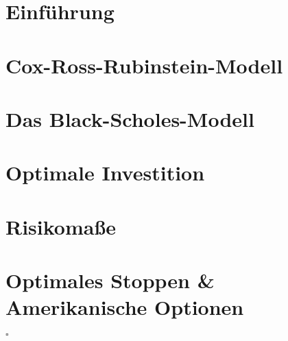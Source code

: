 \documentclass[ngerman, a4paper, 11pt]{report}
\institute{Stochastik}
\begin{document}
\makeTUtitle
    
\tableofcontents

\chapter{Einführung}
\label{chapter_1_einfuehrung}






\chapter{Cox-Ross-Rubinstein-Modell}
\label{chapter_2_crr}





\chapter{Das Black-Scholes-Modell}
\label{chapter_3_blackScholes}


\chapter{Optimale Investition}
\label{chapter_4_optimaleInvesition}






\chapter{Risikomaße}
\label{chapter_5_risikomasse}






\chapter{Optimales Stoppen \& Amerikanische Optionen}
\label{chapter_6_optimalesStoppen}




\vfill \hfill $\square$
\end{document}
